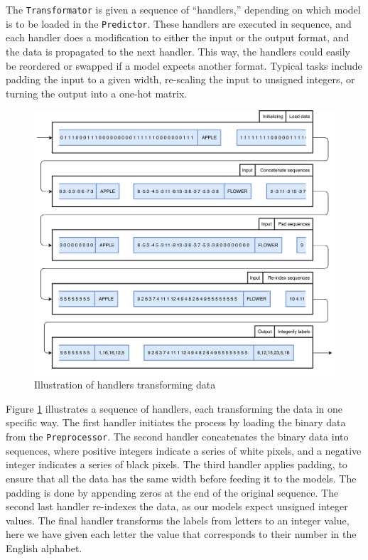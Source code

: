 The {\tt Transformator} is given a sequence of ``handlers,'' depending on which model is to be loaded in the {\tt Predictor}. These handlers are executed in sequence, and each handler does a modification to either the input or the output format, and the data is propagated to the next handler. This way, the handlers could easily be reordered or swapped if a model expects another format. Typical tasks include padding the input to a given width, re-scaling the input to unsigned integers, or turning the output into a one-hot matrix.

\begin{figure}[ht]
    \centering
    \includegraphics[width=1\textwidth]{fig/development_process/transformator.png}
    \caption{Illustration of handlers transforming data}
    \label{fig:development-transformator}
\end{figure}

Figure \ref{fig:development-transformator} illustrates a sequence of handlers, each transforming the data in one specific way. The first handler initiates the process by loading the binary data from the {\tt Preprocessor}. The second handler concatenates the binary data into sequences, where positive integers indicate a series of white pixels, and a negative integer indicates a series of black pixels. The third handler applies padding, to ensure that all the data has the same width before feeding it to the models. The padding is done by appending zeros at the end of the original sequence. The second last handler re-indexes the data, as our models expect unsigned integer values. The final handler transforms the labels from letters to an integer value, here we have given each letter the value that corresponds to their number in the English alphabet.

